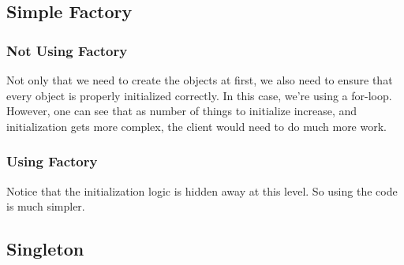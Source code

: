 \subsection{Simple Factory}
\label{code:simple-factory}
\subsubsection{Not Using Factory}
Not only that we need to create the objects at first, we also need to ensure that every object is properly initialized correctly. In this case, we're using a for-loop. However, one can see that as number of things to initialize increase, and initialization gets more complex, the client would need to do much more work.

\subsubsection{Using Factory}
Notice that the initialization logic is hidden away at this level. So using the code is much simpler.


\subsection{Singleton}
\label{code:singleton}